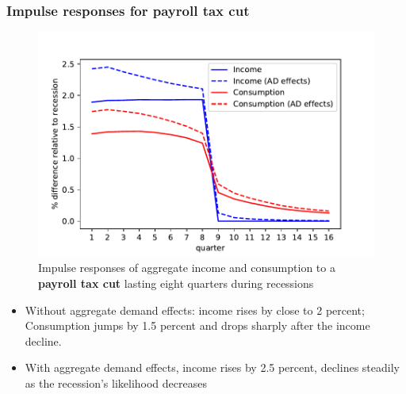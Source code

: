 \documentclass[pdflatex]{beamer}
\begin{document}
\begin{frame}
\frametitle{Impulse responses for payroll tax cut}

	\begin{figure}
		\centering
		\includegraphics[width=0.6\linewidth]{Code/HA-Models/FromPandemicCode/Figures/recession_taxcut_relrecession}
		\caption{Impulse responses of aggregate income and consumption to a \textbf{payroll tax cut} lasting eight quarters during recessions}
	\end{figure}
	
	
	\begin{itemize}
		\item Without aggregate demand effects: income rises by close to 2 percent; Consumption jumps by 1.5 percent and drops sharply after the income decline.
		\item With aggregate demand effects, income rises by 2.5 percent, declines steadily as the recession's likelihood decreases
	\end{itemize}






\end{frame}
\end{document}
